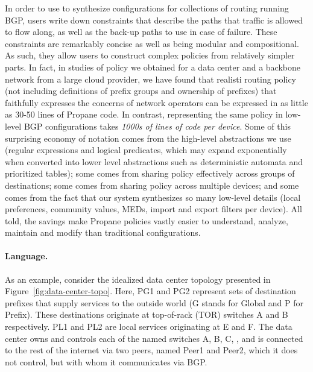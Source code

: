 In order to use \Propane to synthesize configurations for collections
of routing running BGP, users write down constraints that 
describe the paths that traffic is allowed to flow along, as well
as the back-up paths to use in case of failure.  These constraints are
remarkably
concise as well as being modular and compositional.
As such, they allow users to construct complex policies
from relatively simpler parts.  In fact, in studies of policy we obtained
for a data center 
and a backbone network from a large cloud provider, we have found that 
realisti
routing policy (not including definitions of prefix groups and ownership of
prefixes) that faithfully expresses the concerns of network operators
can be expressed in as little as 30-50 lines of Propane
code.  In contrast, representing the same policy in low-level BGP 
configurations takes \emph{1000s of lines of code per device}.
Some of this surprising economy of notation comes from the high-level 
abstractions we use
(regular expressions and logical predicates, which may expand exponentially
when converted into lower level abstractions such as deterministic
automata and prioritized tables); some comes from sharing
policy effectively across groups of destinations; some comes from
sharing policy across multiple devices; and some comes from the fact
that our system synthesizes so many low-level details (local preferences,
community values, MEDs, import and export filters per device).  All told, 
the savings make Propane policies vastly
easier to understand, analyze, maintain and modify than traditional
configurations.

\paragraph*{Language.}
As an example, consider the idealized data center topology presented in
Figure~\ref{fig:data-center-topo}.  Here, PG1 and PG2 represent sets
of destination prefixes that supply services to the outside world (G stands
for Global and P for Prefix).  These destinations originate at top-of-rack (TOR)
switches A and B respectively.  PL1 and PL2 are local services originating
at E and F.  The data center owns and controls each of the named switches
A, B, C, \etc, and is connected to the rest of the internet via
two peers, named Peer1 and Peer2, which it does not control, but with
whom it communicates via BGP.

